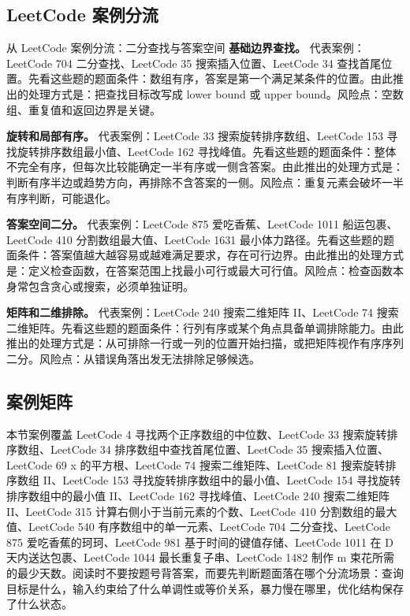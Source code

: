 \subsection{LeetCode 案例分流}

\begin{principlebox}{从 LeetCode 案例分流：二分查找与答案空间}
\textbf{基础边界查找。}
代表案例：LeetCode 704 二分查找、LeetCode 35 搜索插入位置、LeetCode 34 查找首尾位置。先看这些题的题面条件：数组有序，答案是第一个满足某条件的位置。由此推出的处理方式是：把查找目标改写成 lower bound 或 upper bound。风险点：空数组、重复值和返回边界是关键。

\textbf{旋转和局部有序。}
代表案例：LeetCode 33 搜索旋转排序数组、LeetCode 153 寻找旋转排序数组最小值、LeetCode 162 寻找峰值。先看这些题的题面条件：整体不完全有序，但每次比较能确定一半有序或一侧含答案。由此推出的处理方式是：判断有序半边或趋势方向，再排除不含答案的一侧。风险点：重复元素会破坏一半有序判断，可能退化。

\textbf{答案空间二分。}
代表案例：LeetCode 875 爱吃香蕉、LeetCode 1011 船运包裹、LeetCode 410 分割数组最大值、LeetCode 1631 最小体力路径。先看这些题的题面条件：答案值越大越容易或越难满足要求，存在可行边界。由此推出的处理方式是：定义检查函数，在答案范围上找最小可行或最大可行值。风险点：检查函数本身常包含贪心或搜索，必须单独证明。

\textbf{矩阵和二维排除。}
代表案例：LeetCode 240 搜索二维矩阵 II、LeetCode 74 搜索二维矩阵。先看这些题的题面条件：行列有序或某个角点具备单调排除能力。由此推出的处理方式是：从可排除一行或一列的位置开始扫描，或把矩阵视作有序序列二分。风险点：从错误角落出发无法排除足够候选。

\end{principlebox}

\subsection{案例矩阵}

本节案例覆盖 LeetCode 4 寻找两个正序数组的中位数、LeetCode 33 搜索旋转排序数组、LeetCode 34 排序数组中查找首尾位置、LeetCode 35 搜索插入位置、LeetCode 69 x 的平方根、LeetCode 74 搜索二维矩阵、LeetCode 81 搜索旋转排序数组 II、LeetCode 153 寻找旋转排序数组中的最小值、LeetCode 154 寻找旋转排序数组中的最小值 II、LeetCode 162 寻找峰值、LeetCode 240 搜索二维矩阵 II、LeetCode 315 计算右侧小于当前元素的个数、LeetCode 410 分割数组的最大值、LeetCode 540 有序数组中的单一元素、LeetCode 704 二分查找、LeetCode 875 爱吃香蕉的珂珂、LeetCode 981 基于时间的键值存储、LeetCode 1011 在 D 天内送达包裹、LeetCode 1044 最长重复子串、LeetCode 1482 制作 m 束花所需的最少天数。阅读时不要按题号背答案，而要先判断题面落在哪个分流场景：查询目标是什么，输入约束给了什么单调性或等价关系，暴力慢在哪里，优化结构保存了什么状态。

